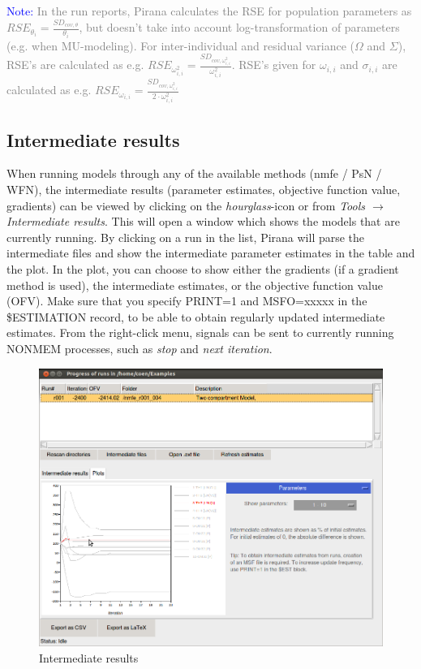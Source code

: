 {{{\vspace{10pt}
\noindent\scriptsize{\textcolor{Blue}{Note:} \textcolor{Grey} {In the
    run reports, Pirana calculates the RSE for population parameters
    as $RSE_{\theta_i} = \frac{SD_{cov,\theta}}{\theta_{i}}$, but doesn't take into account
    log-transformation of parameters (e.g. when MU-modeling). For
    inter-individual and residual variance ($\Omega$ and $\Sigma$),
    RSE's are calculated as e.g. $RSE_{\omega_{i,i}^2} =
    \frac{SD_{cov,\omega_{i,i}^2}}{\omega_{i,i}^2}$. RSE's given for
    $\omega_{i,i}$ and $\sigma_{i,i}$ are calculated as e.g. $RSE_{\omega_{i,i}} =
    \frac{SD_{cov,\omega_{i,i}^2}}{2 \cdot \omega_{i,i}^2}$ } \normalsize
\vspace{10pt}

\subsection{Intermediate results} When running models through any of
the available methods (nmfe / PsN / WFN), the intermediate results
(parameter estimates, objective function value, gradients) can be
viewed by clicking on the \textit{hourglass}-icon or from
\textit{Tools $\rightarrow$ Intermediate results}. This will open a
window which shows the models that are currently running. By clicking
on a run in the list, Pirana will parse the intermediate files and show the intermediate parameter estimates in the table and the plot. In the plot, you
can choose to show either the gradients (if a gradient method is
used), the intermediate estimates, or the objective function value
(OFV). Make sure that you specify PRINT=1 and MSFO=xxxxx in the
\$ESTIMATION record, to be able to obtain regularly updated
intermediate estimates. From the right-click menu, signals can be
sent to currently running NONMEM processes, such as \textit{stop} and
\textit{next iteration}.

\begin{figure}[H] \centering
    \includegraphics[scale=0.3]{images/intermed.png}
    \caption{Intermediate results}
\end{figure}

}}}}
